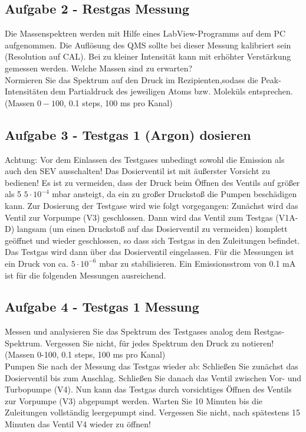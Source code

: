 \subsection*{Aufgabe 2 - Restgas Messung} 
Die Massenspektren werden mit Hilfe eines LabView-Programms auf dem PC aufgenommen. Die Auflösung des QMS sollte bei dieser Messung kalibriert sein (Resolution auf CAL). Bei zu kleiner Intensität kann mit erhöhter Verstärkung gemessen werden. Welche Massen sind zu erwarten? \\
Normieren Sie das Spektrum auf den Druck im Rezipienten,sodass die Peak-Intensitäten dem Partialdruck des jeweiligen Atoms bzw. Moleküls entsprechen. (Massen $0-100$, 0.1 steps, 100 ms pro Kanal) 

\subsection*{Aufgabe 3 - Testgas 1 (Argon) dosieren}
Achtung: Vor dem Einlassen des Testgases unbedingt sowohl die Emission als auch den SEV ausschalten! Das Dosierventil ist mit äußerster Vorsicht zu bedienen! Es ist zu vermeiden, dass der Druck beim Öffnen des Ventils auf größer als 5 $5 \cdot 10^{-4}$ mbar ansteigt, da ein zu großer Druckstoß die Pumpen beschädigen kann. Zur Dosierung der Testgase wird wie folgt vorgegangen: Zunächst wird das Ventil zur Vorpumpe (V3) geschlossen. Dann wird das Ventil zum Testgas (V1A-D) langsam (um einen Druckstoß auf das Dosierventil zu vermeiden) komplett geöffnet und wieder geschlossen, so dass sich Testgas in den Zuleitungen befindet. Das Testgas wird dann über das Dosierventil eingelassen. Für die Messungen ist ein Druck von ca. $5 \cdot 10^{-6}$ mbar zu stabilisieren. Ein Emissionsstrom von 0.1 mA ist für die folgenden Messungen ausreichend. 

\subsection*{Aufgabe 4 - Testgas 1 Messung}
Messen und analysieren Sie das Spektrum des Testgases analog dem Restgas-Spektrum. Vergessen Sie nicht, für jedes Spektrum den Druck zu notieren! (Massen 0-100, 0.1 steps, 100 ms pro Kanal)\\
Pumpen Sie nach der Messung das Testgas wieder ab: Schließen Sie zunächst das Dosierventil bis zum Anschlag. Schließen Sie danach das Ventil zwischen Vor- und Turbopumpe (V4). Nun kann das Testgas durch vorsichtiges Öffnen des Ventils zur Vorpumpe (V3) abgepumpt werden. Warten Sie 10 Minuten bis die Zuleitungen vollständig leergepumpt sind. Vergessen Sie nicht, nach spätestens 15 Minuten das Ventil V4 wieder zu öffnen! 

